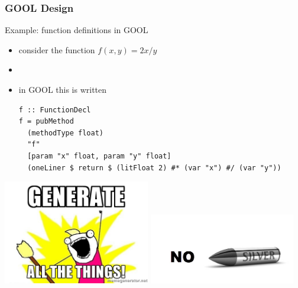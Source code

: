\documentclass{beamer}
\begin{document}
\begin{frame}
\frametitle{GOOL Design}
{\Large Example: function definitions in GOOL\\[1cm]}
\begin{itemize}
\item consider the function $f(x, y) = 2x/y$
\item[]
\item in GOOL this is written
\begin{lstlisting}
f :: FunctionDecl
f = pubMethod
  (methodType float)
  "f"
  [param "x" float, param "y" float] 
  (oneLiner $ return $ (litFloat 2) #* (var "x") #/ (var "y"))
\end{lstlisting}
\end{itemize}
\end{frame}

% 

\begin{frame}
\includegraphics[width=0.48\textwidth]{generate_all_the_things.jpg}
\includegraphics[width=0.48\textwidth]{no_silver_bullet.jpg}
\end{frame}
\end{document}
